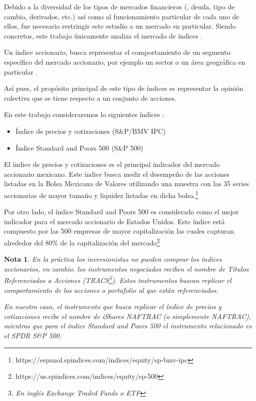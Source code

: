 \documentclass[12pt]{scrbook}
\theoremstyle{break}
\newtheorem{nota}{Nota}[chapter]
\theoremstyle{break}
\begin{document}
Debido a la diversidad de los tipos de mercados financieros (, deuda, tipo de cambio, derivados, etc.) así como al funcionamiento particular de cada uno de ellos, fue necesario restringir este estudio a un mercado en particular. Siendo concretos, este trabajo únicamente analiza el mercado de índices .

Un índice accionario, busca representar el comportamiento de un segmento específico del mercado accionario, por ejemplo un sector o un área geográfica en particular \cite{CFA2019-market-index}.

Así pues, el propósito principal de este tipo de índices es representar la opinión colectiva que se tiene respecto a un conjunto de acciones.

En este trabajo consideraremos lo siguientes índices :

\begin{itemize}
\item Índice de precios y cotizaciones (S\&P/BMV IPC)
\item Índice Standard and Poors 500 (S\&P 500)
\end{itemize}

El índice de precios y cotizaciones es el principal indicador del mercado accionario mexicano. Este índice busca medir el desempeño de las acciones listadas en la Bolsa Mexicana de Valores utilizando una muestra con las 35 series accionarias de mayor tamaño y liquidez listadas en dicha bolsa.\footnote{https://espanol.spindices.com/indices/equity/sp-bmv-ipc}

Por otro lado, el índice Standard and Poors 500 es considerado como el mejor indicador para el mercado accionario de Estados Unidos. Este índice está compuesto por las 500 empresas de mayor capitalización las cuales capturan alrededor del $80\%$ de la capitalización del mercado\footnote{https://us.spindices.com/indices/equity/sp-500}

\begin{nota} \label{nota:ETF}
En la práctica los inversionistas no pueden comprar los índices accionarios, en cambio, los instrumentos negociados reciben el nombre de Títulos Referenciados a Acciones (TRACS\footnote{En inglés Exchange Traded Funds o ETF}). Estos instrumentos buscan replicar el comportamiento de las acciones o portafolio al que están referenciados.

En nuestro caso, el instrumento que busca replicar el índice de precios y cotizaciones recibe el nombre de iShares NAFTRAC (o simplemente NAFTRAC), mientras que para el índice Standard and Poors 500 el instrumento relacionado es el SPDR S\&P 500.
\end{nota}
\end{document}
